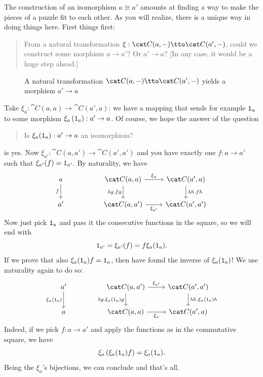 The construction of an isomorphism \(a \cong a'\) amounts at finding a way
to make the pieces of a puzzle fit to each other. As you will realize,
there is a unique way in doing things here. First things first:
%
\begin{quotation}
  From a natural transformation
  \(\xi : \cat C(a, -) \tto \cat C(a', -)\), could we construct some
  morphism \(a \to a'\)? Or \(a' \to a\)? [In any case, it would be a huge
  step ahead.]
\end{quotation}
%
\begin{figure}
  \centering 
  \caption{A natural transformation \(\cat C(a, -) \tto \cat C(a', -)\)
    yields a morphism \(a' \to a\)}
\end{figure}
%
Take \(\xi_a : \cat C (a, a) \to \cat C(a', a)\): we have a mapping that
sends for example \(\mathtt 1_a\) to some morphism
\(\xi_a \left(\mathtt 1_a\right) : a' \to a\). Of course, we hope the answer of
the question
%
\begin{quotation}
  Is \(\xi_a(\mathtt 1_a) : a' \to a\) an isomorphism?
\end{quotation}
is yes. Now \(\xi_{a'} : \cat C(a, a') \to \cat C(a', a')\) and you have
exactly one \(f : a \to a'\) such that \(\xi_{a'}(f) = \mathtt 1_{a'}\). By
naturality, we have
\[
  \begin{tikzcd}
    a \ar["f", d, swap] & & \cat C (a, a) \ar["{\lambda g . fg}", d, swap] \ar["{\xi_a}", r] & \cat C(a', a) \ar["{\lambda h . fh}", d] \\
    a' & & \cat C(a, a') \ar["{\xi_{a'}}", r, swap] & \cat C(a', a')
  \end{tikzcd}
\]
Now just pick \(\mathtt 1_a\) and pass it the consecutive functions in the
square, so we will end with
\[
  \mathtt 1_{a'} = \xi_{a'} (f) = f \xi_{a}(\mathtt 1_a) .
\]
If we prove that also \(\xi_{a}(\mathtt 1_a) f = \mathtt 1_a\), then have found the
inverse of \(\xi_a(\mathtt 1_a)\)! We use naturality again to do so:
\[
  \begin{tikzcd}
    a' \ar["{\xi_a(\id_a)}", d, swap] & & \cat C (a, a') \ar["{\lambda g . \xi_a(\id_a) g}", d, swap] \ar["{\xi_{a'}}", r] & \cat C(a', a') \ar["{\lambda h . \xi_{a} (\id_a)} h", d] \\
    a & & \cat C(a, a) \ar["{\xi_a}", r, swap] & \cat C(a', a)
  \end{tikzcd}
\]
Indeed, if we pick \(f : a \to a'\) and apply the functions as in the
commutative square, we have
\[
  \xi_a \left( \xi_a(\mathtt 1_a) f \right) = \xi_a(\mathtt 1_a) .
\]
Being the \(\xi_a\)'s bijections, we can conclude and that's all.

